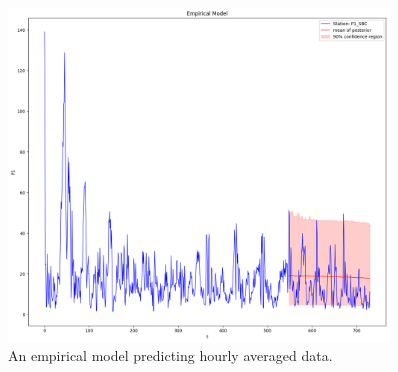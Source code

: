 \documentclass[12pt,a4paper,twoside]{scrartcl}
\numberwithin{equation}{section}
\newcounter{mypagecount}%
\newenvironment{interlude}{%
  \clearpage
  \setcounter{mypagecount}{\value{page}}%
  \thispagestyle{empty}%
  \pagestyle{empty}%
}{%
  \clearpage
  \setcounter{page}{\value{mypagecount}}%
}
\begin{document}
\begin{interlude}
\begin{appendices}
\begin{center}
\begin{figure}[h!]
      \end{figure}
    \end{center}
    \begin{center}
      \begin{figure}[H]
        \centering
        \includegraphics[height=0.5\textwidth, width=0.9\textwidth]{figures/model_plots/emp-12h}
        \caption[Empirical one hour plot]{An empirical model predicting hourly averaged data.}\label{fig:emp-1h}
      \end{figure}
    \end{center}
  \end{appendices}
  \clearpage
  
  
\end{interlude}
\end{document}
